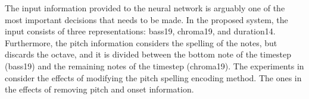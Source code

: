 
The input information provided to the neural network is
arguably one of the most important decisions that needs to
be made. In the proposed system, the input consists of three
representations: \gls{bass19}, \gls{chroma19}, and
\gls{duration14}. Furthermore, the pitch information
considers the spelling of the notes, but discards the
octave, and it is divided between the bottom note of the
timestep (\gls{bass19}) and the remaining notes of the
timestep (\gls{chroma19}). The experiments in
 consider the
effects of modifying the pitch spelling encoding method. The
ones in  the effects of
removing pitch and onset information.
